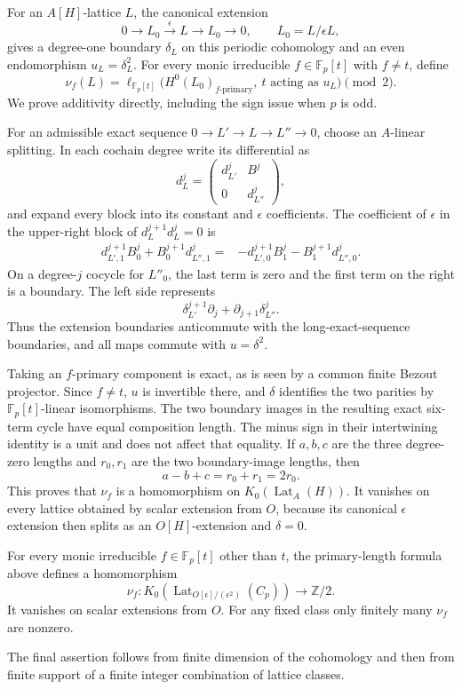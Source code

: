 For an $A[H]$-lattice $L$, the canonical extension
\[
 0\longrightarrow L_0\xrightarrow{\epsilon}L\longrightarrow L_0
 \longrightarrow0,\qquad L_0=L/\epsilon L,
\]
gives a degree-one boundary $\delta_L$ on this periodic cohomology and an
even endomorphism $u_L=\delta_L^2$.  For every monic irreducible
$f\in\mathbb F_p[t]$ with $f\ne t$, define
\[
 \nu_f(L)=
 \ell_{\mathbb F_p[t]}
 \bigl(H^0(L_0)_{f\text{-primary}},\ t\text{ acting as }u_L\bigr)
 \pmod2.
\]
We prove additivity directly, including the sign issue when $p$ is odd.

For an admissible exact sequence $0\to L'\to L\to L''\to0$, choose an
$A$-linear splitting.  In each cochain degree write its differential as
\[
 d_L^j=\begin{pmatrix}d_{L'}^j&B^j\\0&d_{L''}^j\end{pmatrix},
\]
and expand every block into its constant and $\epsilon$ coefficients.
The coefficient of $\epsilon$ in the upper-right block of
$d_L^{j+1}d_L^j=0$ is
\begin{align*}
 d_{L',1}^{j+1}B_0^j+B_0^{j+1}d_{L'',1}^j
 ={}&-d_{L',0}^{j+1}B_1^j-B_1^{j+1}d_{L'',0}^j.
\end{align*}
On a degree-$j$ cocycle for $L''_0$, the last term is zero and the first
term on the right is a boundary.  The left side represents
\[
 \delta_{L'}^{j+1}\partial_j+
 \partial_{j+1}\delta_{L''}^j.
\]
Thus the extension boundaries anticommute with the long-exact-sequence
boundaries, and all maps commute with $u=\delta^2$.

Taking an $f$-primary component is exact, as is seen by a common finite
Bezout projector.  Since $f\ne t$, $u$ is invertible there, and $\delta$
identifies the two parities by $\mathbb F_p[t]$-linear isomorphisms.  The
two boundary images in the resulting exact six-term cycle have equal
composition length.  The minus sign in their intertwining identity is a
unit and does not affect that equality.  If $a,b,c$ are the three
degree-zero lengths and $r_0,r_1$ are the two boundary-image lengths, then
\[
 a-b+c=r_0+r_1=2r_0.
\]
This proves that $\nu_f$ is a homomorphism on
$K_0(\operatorname{Lat}_A(H))$.  It vanishes on every lattice obtained by
scalar extension from $O$, because its canonical $\epsilon$ extension then
splits as an $O[H]$-extension and $\delta=0$.

\begin{proposition}\label{prop:dual-bockstein-invariants}
For every monic irreducible $f\in\mathbb F_p[t]$ other than $t$, the
primary-length formula above defines a homomorphism
\[
 \nu_f:K_0(\operatorname{Lat}_{O[\epsilon]/(\epsilon^2)}(C_p))
       \longrightarrow\mathbb Z/2.
\]
It vanishes on scalar extensions from $O$.  For any fixed class only
finitely many $\nu_f$ are nonzero.
\end{proposition}
The final assertion follows from finite dimension of the cohomology and
then from finite support of a finite integer combination of lattice classes.


